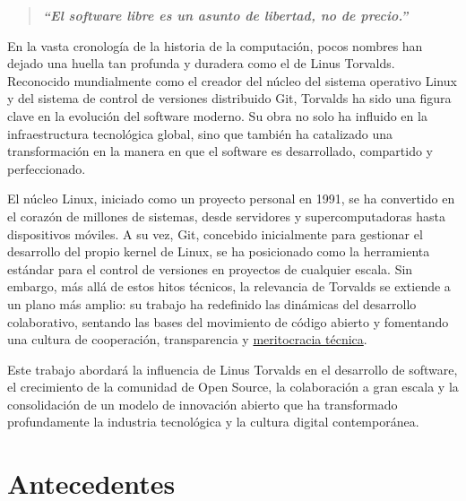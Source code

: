 \documentclass[a4paper,12pt]{article}
\begin{document}
\begin{quote}
\textbf{\textit{“El software libre es un asunto de libertad, no de precio.”}} 
\end{quote}

En la vasta cronología de la historia de la computación, pocos nombres han
dejado una huella tan profunda y duradera como el de Linus Torvalds. Reconocido
mundialmente como el creador del núcleo del sistema operativo Linux y del
sistema de control de versiones distribuido Git, Torvalds ha sido una figura
clave en la evolución del software moderno. Su obra no solo ha influido en la
infraestructura tecnológica global, sino que también ha catalizado una
transformación en la manera en que el software es desarrollado, compartido y
perfeccionado.

El núcleo Linux, iniciado como un proyecto personal en 1991, se ha convertido en
el corazón de millones de sistemas, desde servidores y supercomputadoras hasta
dispositivos móviles. A su vez, Git, concebido inicialmente para gestionar el
desarrollo del propio kernel de Linux, se ha posicionado como la herramienta
estándar para el control de versiones en proyectos de cualquier escala. Sin
embargo, más allá de estos hitos técnicos, la relevancia de Torvalds se extiende
a un plano más amplio: su trabajo ha redefinido las dinámicas del desarrollo
colaborativo, sentando las bases del movimiento de código abierto y fomentando
una cultura de cooperación, transparencia y \hyperref[meritocracia]{meritocracia técnica}.

Este trabajo abordará la influencia de Linus Torvalds en el desarrollo de
software, el crecimiento de la comunidad de Open Source, la colaboración a gran
escala y la consolidación de un modelo de innovación abierto que ha transformado
profundamente la industria tecnológica y la cultura digital contemporánea.  
\newpage

\section{Antecedentes} 
\end{document}
